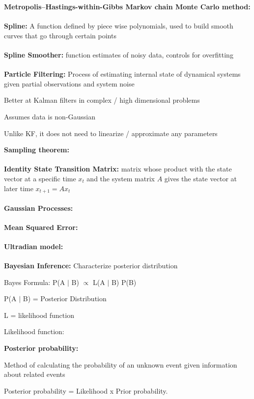 \documentclass{article}
\begin{document}
\textbf{Metropolis–Hastings-within-Gibbs Markov chain Monte Carlo method:} \\ \\
\textbf{Spline:} A function defined by piece wise polynomials, used to build smooth curves that go through certain points \\ \\
\textbf{Spline Smoother:} function estimates of noisy data, controls for overfitting \\ \\
\textbf{Particle Filtering:} Process of estimating internal state of dynamical systems given partial observations and system noise 
\begin{description}[labelindent=1cm]
   \item[$\bullet$] Better at Kalman filters in complex / high dimensional problems
   \item[$\bullet$] Assumes data is non-Gaussian 
   \item[$\bullet$] Unlike KF, it does not need to linearize / approximate any parameters
\end{description}
\textbf{Sampling theorem:} \\ \\
\textbf{Identity State Transition Matrix:} matrix whose product with the state vector at a specific time $x_t$ and the system matrix $A$ gives the state vector at later time $x_{t + 1} = A x_t$\\ \\
\textbf{Gaussian Processes:} \\ \\
\textbf{Mean Squared Error:} \\ \\
\textbf{Ultradian model:} \\ \\
\textbf{Bayesian Inference:} Characterize posterior distribution
\begin{description} [labelindent=1cm]
  \item[$\bullet$] Bayes Formula: P(A $ | $ B) $\propto$ L(A $ | $ B) P(B)
  \indent\item[$\bullet$] P(A $ | $ B) = Posterior Distribution 
  \indent\item[$\bullet$]L  = likelihood function
  \indent\item[$\bullet$]Likelihood function: 
\end{description}
\textbf{Posterior probability: }
\begin{description} [labelindent=1cm]
  \item[$\bullet$] Method of calculating the probability of an unknown event given information about related events 
  \item[$\bullet$] Posterior probability = Likelihood x Prior probability.
\end{description} 
\end{document}
